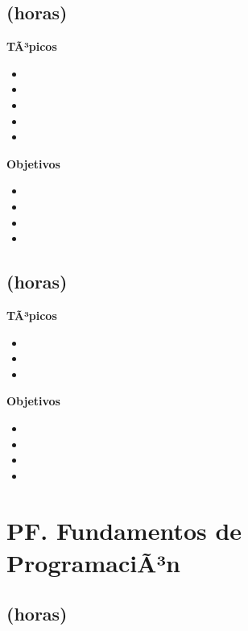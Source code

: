 \subsection{\DSCINCODef  (\DSCINCOHours horas)}\label{sec:BOK-DS5}

\textbf{TÃ³picos}
\begin{itemize}
	\item \DSCINCOTopicArboles
	\item \DSCINCOTopicGrafos
	\item \DSCINCOTopicGrafosdirigidos
	\item \DSCINCOTopicArbolesde
	\item \DSCINCOTopicEstrategias
\end{itemize}

\textbf{Objetivos}
\begin{itemize}
	\item \DSCINCOObjUNO
	\item \DSCINCOObjDOS
	\item \DSCINCOObjTRES
	\item \DSCINCOObjCUATRO
\end{itemize}

\subsection{\DSSEISDef  (\DSSEISHours horas)}\label{sec:BOK-DS6}

\textbf{TÃ³picos}
\begin{itemize}
	\item \DSSEISTopicEspacios
	\item \DSSEISTopicProbabilidad
	\item \DSSEISTopicVariables
\end{itemize}

\textbf{Objetivos}
\begin{itemize}
	\item \DSSEISObjUNO
	\item \DSSEISObjDOS
	\item \DSSEISObjTRES
	\item \DSSEISObjCUATRO
\end{itemize}

\section{PF. Fundamentos de ProgramaciÃ³n}\label{sec:BOK-PF}

\subsection{\PFUNODef  (\PFUNOHours horas)}\label{sec:BOK-PF1}

